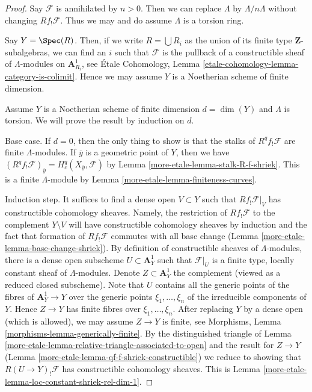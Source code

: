 \begin{proof}
Say $\mathcal{F}$ is annihilated by $n > 0$. Then we can replace
$\Lambda$ by $\Lambda/n\Lambda$ without changing $Rf_!\mathcal{F}$.
Thus we may and do assume $\Lambda$ is a torsion ring.

\medskip\noindent
Say $Y = \Spec(R)$. Then, if we write
$R = \bigcup R_i$ as the union of its finite type $\mathbf{Z}$-subalgebras,
we can find an $i$ such that $\mathcal{F}$ is the pullback of
a constructible sheaf of $\Lambda$-modules on $\mathbf{A}^1_{R_i}$, see
\'Etale Cohomology, Lemma \ref{etale-cohomology-lemma-category-is-colimit}.
Hence we may assume $Y$ is a Noetherian scheme of finite dimension.

\medskip\noindent
Assume $Y$ is a Noetherian scheme of finite dimension $d = \dim(Y)$
and $\Lambda$ is torsion. We will prove the result by induction on $d$.

\medskip\noindent
Base case. If $d = 0$, then the only thing to show is that the stalks
of $R^qf_!\mathcal{F}$ are finite $\Lambda$-modules.
If $\overline{y}$ is a geometric point of $Y$, then we have
$(R^qf_!\mathcal{F})_{\overline{y}} = H^q_c(X_{\overline{y}}, \mathcal{F})$
by Lemma \ref{more-etale-lemma-stalk-R-f-shriek}.
This is a finite $\Lambda$-module by Lemma \ref{more-etale-lemma-finiteness-curves}.

\medskip\noindent
Induction step. It suffices to find a dense open $V \subset Y$ such
that $Rf_!\mathcal{F}|_V$ has constructible cohomology sheaves. Namely, the
restriction of $Rf_!\mathcal{F}$ to the complement $Y \setminus V$
will have constructible cohomology sheaves by induction
and the fact that formation of $Rf_!\mathcal{F}$ commutes
with all base change (Lemma \ref{more-etale-lemma-base-change-shriek}).
By definition of constructible sheaves of $\Lambda$-modules, there is a dense
open subscheme $U \subset \mathbf{A}^1_Y$ such that $\mathcal{F}|_U$
is a finite type, locally constant sheaf of $\Lambda$-modules.
Denote $Z \subset \mathbf{A}^1_Y$ the complement (viewed as a reduced
closed subscheme). Note that $U$ contains all the generic points of the
fibres of $\mathbf{A}^1_Y \to Y$ over the generic points
$\xi_1, \ldots, \xi_n$ of the irreducible components of $Y$.
Hence $Z \to Y$ has finite fibres over $\xi_1, \ldots, \xi_n$.
After replacing $Y$ by a dense open (which is allowed), we may
assume $Z \to Y$ is finite, see
Morphisms, Lemma \ref{morphisms-lemma-generically-finite}.
By the distinguished triangle of
Lemma \ref{more-etale-lemma-relative-triangle-associated-to-open}
and the result for $Z \to Y$ (Lemma \ref{more-etale-lemma-qf-f-shriek-constructible})
we reduce to showing that
$R(U \to Y)_!\mathcal{F}$ has constructible cohomology sheaves.
This is Lemma \ref{more-etale-lemma-loc-constant-shriek-rel-dim-1}.
\end{proof}

